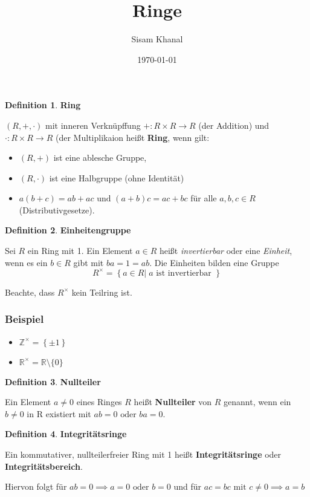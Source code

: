 \documentclass[12pt]{article}
\title{Ringe}
\author{Sisam Khanal}
\date{\today}
\begin{document}
\maketitle

\newtheorem{theorem}{Theorem}
\theoremstyle{definition}
\newtheorem{definition}{Definition}
\newcommand{\iu}{{i\mkern1mu}}
\newcommand{\defn}[2]{
	\begin{definition} \textbf{ #1}
  #2
  \end{definition}
}


\defn{Ring}{
	$ \left( R, +, \cdot \right)  $ mit inneren Verknüpffung $ + : R \times R \to R  $ (der Addition) und 
	$ \cdot : R \times R \to R $ (der Multiplikaion heißt \textbf{Ring}, wenn gilt:
	\begin{itemize}
		\item $ (R, +)  $ ist eine ablesche Gruppe,
		\item $ (R,\cdot) $ ist eine Halbgruppe (ohne Identität)
		\item $ a(b+c) = ab +ac \text{ und } (a+b)c = ac+bc $ für alle $ a,b,c \in R $ (Distributivgesetze).
	\end{itemize}
}
\defn{Einheitengruppe}{
	Sei $ R $ ein Ring mit 1. Ein Element $ a \in R $ heißt \textit{invertierbar} oder eine \textit{Einheit},
	wenn es ein $ b \in R $ gibt mit $ ba = 1 = ab $. Die Einheiten bilden eine Gruppe 
	$$ R^{\times} = \left\{ a \in R | \;  a \text{ ist invertierbar  } \right\}  $$
}
Beachte, dass $ R^{\times} $ kein Teilring ist.
\subsubsection*{Beispiel}
\begin{itemize}
	\item $ \mathbb{Z}^{\times} = \left\{ \pm 1 \right\}  $
	\item $ \mathbb{R}^{\times} = \mathbb{R} \setminus \{0\} $ 
\end{itemize}
\defn{Nullteiler}{
	Ein Element $ a \neq 0 $ eines Ringes $ R $ heißt \textbf{Nullteiler} von $ R $ genannt, wenn ein 
	$ b \neq 0 $ in R existiert mit $ a b = 0 \text{ oder } b a=0	$. 
}
\defn{Integritätsringe}{
	Ein kommutativer, nullteilerfreier Ring mit 1 heißt \textbf{Integritätsringe} oder \textbf{Integritätsbereich}.
}
	Hiervon folgt für $ a b=0 \implies a = 0 \text{ oder } b = 0$ und für $ ac = bc \text{ mit } c \neq 0 \implies a = b $ 
\end{document}

